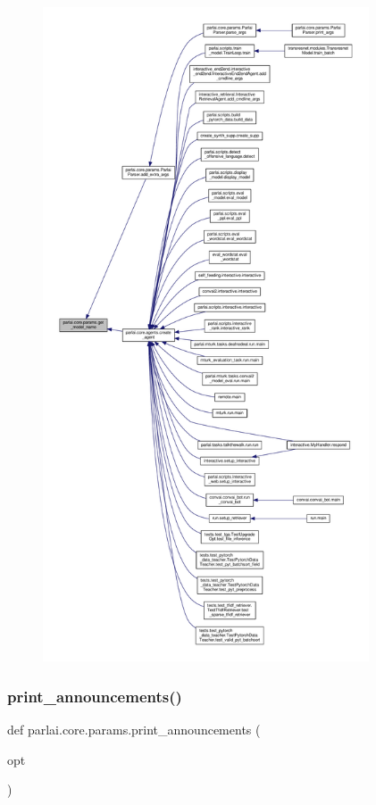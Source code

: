 \begin{figure}[H]
\begin{center}
\leavevmode
\includegraphics[height=550pt]{namespaceparlai_1_1core_1_1params_a6d160324f6af84562334fd0698141074_icgraph}
\end{center}
\end{figure}
\mbox{\label{namespaceparlai_1_1core_1_1params_afd1a47c94990168ea9e70d894a79bd2c}} 
\subsubsection{\texorpdfstring{print\+\_\+announcements()}{print\_announcements()}}
{\footnotesize\ttfamily def parlai.\+core.\+params.\+print\+\_\+announcements (\begin{DoxyParamCaption}\item[{}]{opt }\end{DoxyParamCaption})}

